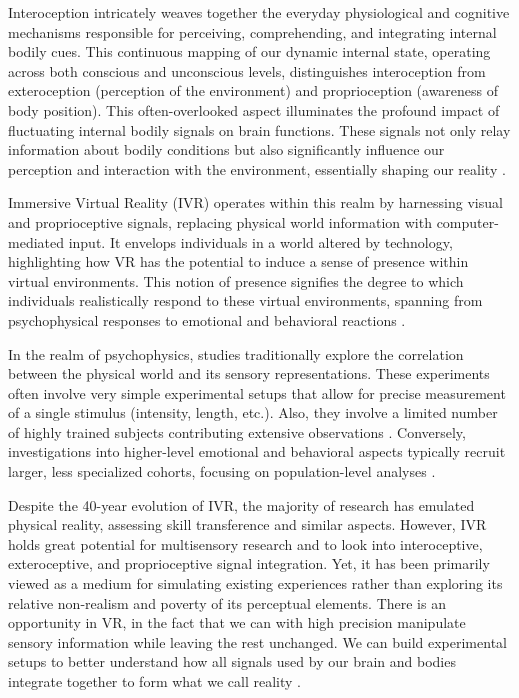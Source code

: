 \documentclass[12pt,oneside,openright]{report}
\begin{document}
Interoception intricately weaves together the everyday physiological and cognitive mechanisms responsible for perceiving, comprehending, and integrating internal bodily cues. This continuous mapping of our dynamic internal state, operating across both conscious and unconscious levels, distinguishes interoception from exteroception (perception of the environment) and proprioception (awareness of body position). This often-overlooked aspect illuminates the profound impact of fluctuating internal bodily signals on brain functions. These signals not only relay information about bodily conditions but also significantly influence our perception and interaction with the environment, essentially shaping our reality \parencite{Galvez-Pol2022-vb}.

Immersive Virtual Reality (IVR) operates within this realm by harnessing visual and proprioceptive signals, replacing physical world information with computer-mediated input. It envelops individuals in a world altered by technology, highlighting how VR has the potential to induce a sense of presence within virtual environments. This notion of presence signifies the degree to which individuals realistically respond to these virtual environments, spanning from psychophysical responses to emotional and behavioral reactions \parencite{SanchezVives2005FromPT}.

In the realm of psychophysics, studies traditionally explore the correlation between the physical world and its sensory representations. These experiments often involve very simple experimental setups that allow for precise measurement of a single stimulus (intensity, length, etc.). Also, they involve a limited number of highly trained subjects contributing extensive observations \parencite{KINGDOM2012234,WASKOM2019100}. Conversely, investigations into higher-level emotional and behavioral aspects typically recruit larger, less specialized cohorts, focusing on population-level analyses \parencite{WASKOM2019100}.

Despite the 40-year evolution of IVR, the majority of research has emulated physical reality, assessing skill transference and similar aspects. However, IVR holds great potential for multisensory research and to look into interoceptive, exteroceptive, and proprioceptive signal integration. Yet, it has been primarily viewed as a medium for simulating existing experiences rather than exploring its relative non-realism and poverty of its perceptual elements. There is an opportunity in VR, in the fact that we can with high precision manipulate sensory information while leaving the rest unchanged. We can build experimental setups to better understand how all signals used by our brain and bodies integrate together to form what we call reality \parencite{Vasser2020GuidelinesFI, deGelder2018VirtualRA}.
\end{document}
